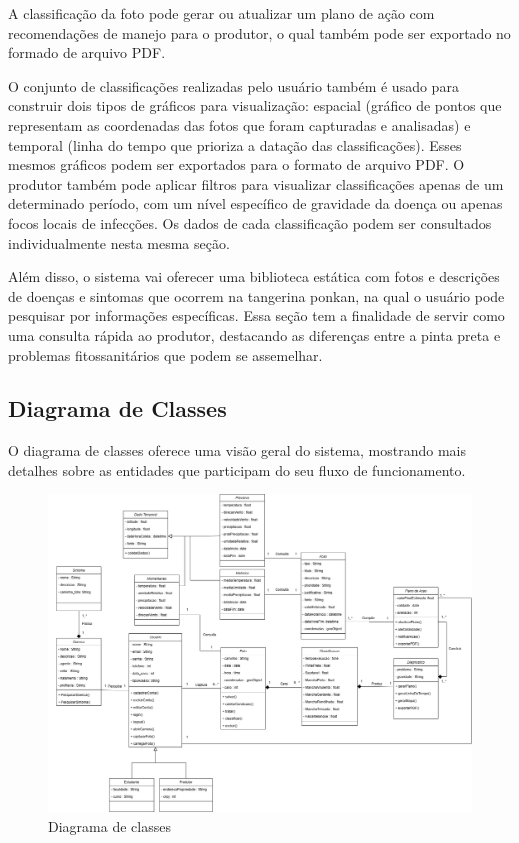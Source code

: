 \documentclass[
  a4paper,%
  12pt,%
  english,%
  brazilian,%
]{article}
\begin{document}
    A classificação da foto pode gerar ou atualizar um plano de ação com recomendações de manejo para o produtor, o qual também pode ser exportado no formado de arquivo PDF.

    O conjunto de classificações realizadas pelo usuário também é usado para construir dois tipos de gráficos para visualização: espacial (gráfico de pontos que representam as coordenadas das fotos que foram capturadas e analisadas) e temporal (linha do tempo que prioriza a datação das classificações). 
    Esses mesmos gráficos podem ser exportados para o formato de arquivo PDF. O produtor também pode aplicar filtros para visualizar classificações apenas de um determinado período, com um nível específico de gravidade da doença ou apenas focos locais de infecções.
    Os dados de cada classificação podem ser consultados individualmente nesta mesma seção. 

    Além disso, o sistema vai oferecer uma biblioteca estática com fotos e descrições de doenças e sintomas que ocorrem na tangerina ponkan, na qual o usuário pode pesquisar por informações específicas. Essa seção tem a finalidade de servir como uma consulta rápida ao produtor, destacando as diferenças entre a pinta preta e problemas fitossanitários que podem se assemelhar.

    \subsection*{Diagrama de Classes}

    O diagrama de classes oferece uma visão geral do sistema, mostrando mais detalhes sobre as entidades que participam do seu fluxo de funcionamento.
    
    


    \begin{figure}[h]
\centering
\caption{Diagrama de classes}%
\label{fig:diagrama-classe}
 \includegraphics[width=1.0\textwidth]{Logos/classes_blackspot.png}
\end{figure}
\end{document}
